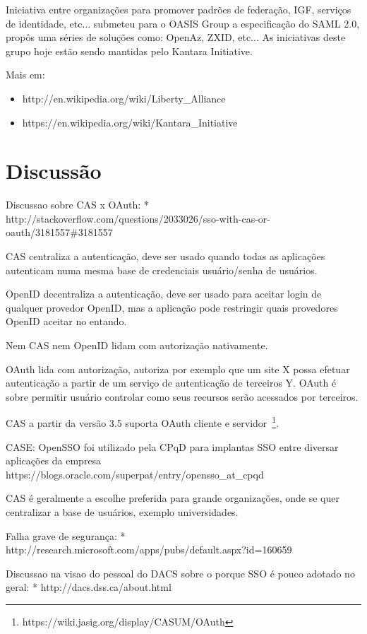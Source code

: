 \documentclass[11pt]{article}
\begin{document}
Iniciativa entre organizações para promover padrões de federação, IGF,
serviços de identidade, etc... submeteu para o OASIS Group a especificação do
SAML 2.0, propôs uma séries de soluções como: OpenAz, ZXID, etc... As
iniciativas deste grupo hoje estão sendo mantidas pelo Kantara Initiative.

Mais em:
\begin{itemize}
  \item{http://en.wikipedia.org/wiki/Liberty\_Alliance}
  \item{https://en.wikipedia.org/wiki/Kantara\_Initiative}
\end{itemize}

\section{Discussão}

Discussao sobre CAS x OAuth:
* http://stackoverflow.com/questions/2033026/sso-with-cas-or-oauth/3181557\#3181557

CAS centraliza a autenticação, deve ser usado quando todas as aplicações
autenticam numa mesma base de credenciais usuário/senha de usuários.

OpenID decentraliza a autenticação, deve ser usado para aceitar login de
qualquer provedor OpenID, mas a aplicação pode restringir quais provedores
OpenID aceitar no entando.

Nem CAS nem OpenID lidam com autorização nativamente.

OAuth lida com autorização, autoriza por exemplo que um site X possa efetuar
autenticação a partir de um serviço de autenticação de terceiros Y. OAuth é
sobre permitir usuário controlar como seus recursos serão acessados por
terceiros.

CAS a partir da versão 3.5 suporta OAuth cliente e
servidor~\footnote{https://wiki.jasig.org/display/CASUM/OAuth}.

CASE: OpenSSO foi utilizado pela CPqD para implantas SSO entre diversar aplicações
da empresa https://blogs.oracle.com/superpat/entry/opensso\_at\_cpqd

CAS é geralmente a escolhe preferida para grande organizações, onde se quer
centralizar a base de usuários, exemplo universidades.

Falha grave de segurança:
* http://research.microsoft.com/apps/pubs/default.aspx?id=160659

Discussao na visao do pessoal do DACS sobre o porque SSO é pouco adotado no
geral:
* http://dacs.dss.ca/about.html
\end{document}
